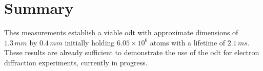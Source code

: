 \section{Summary}

Thes measurements establish a viable \gls{odt} with approximate dimensions of $1.3\,\unit{mm}$ by $0.4\,\unit{mm}$ initially holding $6.05\times10^6$ atoms with a lifetime of $2.1\,\unit{ms}$. These results are already sufficient to demonstrate the use of the \gls{odt} for electron diffraction experiments, currently in progress.
